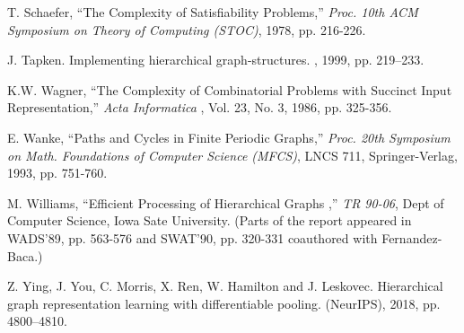 \begin{thebibliography}{HMRR93}
T. Schaefer,
``The Complexity of Satisfiability Problems,''
{\em Proc. 10th ACM Symposium on Theory of Computing (STOC)}, 
1978, pp. 216-226.


\iffalse
\bibitem[Sc78a]{Sc78a} 
T. Schaefer,
``On the Complexity of Some Two-Person Perfect Information Games,''
{\em Journal of Computer and System Sciences (JCSS),} 
1978, pp. 185-225.



\bibitem[Sc76]{Sc76} C. Schnorr
``Satisfiability is quasilinear complete for NQL,''
{\em Journal of the ACM (J. ACM),} 
No. 25, 1976, pp. 136-145.


	
\bibitem[SH90]{SH90} R. E. Stearns and H. B. Hunt III
``Power Indices and Easier Hard Problems,''
{\em Mathematical Systems Theory}
Vol. 23, 1990, pp. 209-225.
\fi

J. Tapken. 
\newblock Implementing hierarchical graph-structures.
,
1999, pp. 219--233.

\iffalse
\bibitem[Wa84]{Wa84}  K.W. Wagner,
``The  Complexity of Problems Concerning Graphs with Regularities'',
{\em Proc. 11th Symposium on Math. Foundations of Computer Science (MFCS)},
LNCS 176, Springer-Verlag, 1984, pp. 544-552.
\fi


 K.W. Wagner,
``The Complexity of Combinatorial Problems with Succinct 
Input Representation,''
{\em Acta Informatica }, Vol. 23, No. 3, 1986, pp. 325-356.



  E.  Wanke,
``Paths and Cycles in Finite Periodic Graphs,''
{\em Proc. 20th Symposium on Math. Foundations of Computer Science (MFCS)},
LNCS 711, Springer-Verlag, 1993, pp. 751-760.
	
 M. Williams,
``Efficient Processing of  Hierarchical Graphs ,''
 {\em TR 90-06}, Dept of Computer Science, Iowa Sate University. 
(Parts of the report appeared in WADS'89, pp. 563-576
and SWAT'90, pp. 320-331 coauthored with 
Fernandez-Baca.)

Z. Ying, J. You, C. Morris, X. Ren, W. Hamilton and J. Leskovec.
\newblock  Hierarchical graph representation learning with differentiable pooling.
 (NeurIPS),
2018, pp. 4800--4810.

\end{thebibliography}
